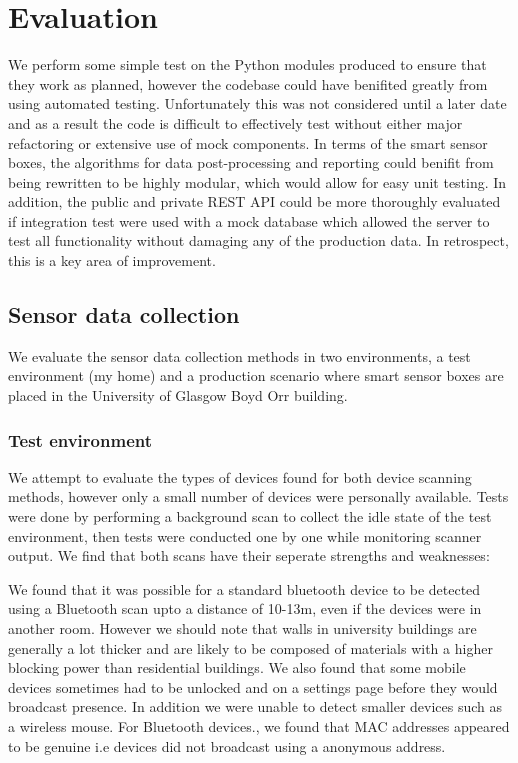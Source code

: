 \documentclass{l4proj}
\begin{document}

\chapter{Evaluation}

We perform some simple test on the Python modules produced to ensure that they work as planned, however the codebase could have benifited greatly from using automated testing. Unfortunately this was not considered until a later date and as a result the code is difficult to effectively test without either major refactoring or extensive use of mock components. In terms of the smart sensor boxes, the algorithms for data post-processing and reporting could benifit from being rewritten to be highly modular, which would allow for easy unit testing. In addition, the public and private REST API could be more thoroughly evaluated if integration test were used with a mock database which allowed the server to test all functionality without damaging any of the production data. In retrospect, this is a key area of improvement.


\section{Sensor data collection}

We evaluate the sensor data collection methods in two environments, a test environment (my home) and a production scenario where smart sensor boxes are placed in the University of Glasgow Boyd Orr building. 

\subsection{Test environment}
We attempt to evaluate the types of devices found for both device scanning methods, however only a small number of devices were personally available. Tests were done by performing a background scan to collect the idle state of the test environment, then tests were conducted one by one while monitoring scanner output. We find that both scans have their seperate strengths and weaknesses:

We found that it was possible for a standard bluetooth device to be detected using a Bluetooth scan upto a distance of 10-13m, even if the devices were in another room. However we should note that walls in university buildings are generally a lot thicker and are likely to be composed of materials with a higher blocking power than residential buildings. We also found that some mobile devices sometimes had to be unlocked and on a settings page before they would broadcast presence. In addition we were unable to detect smaller devices such as a wireless mouse. For Bluetooth devices., we found that MAC addresses appeared to be genuine i.e devices did not broadcast using a anonymous address.
\end{document}
